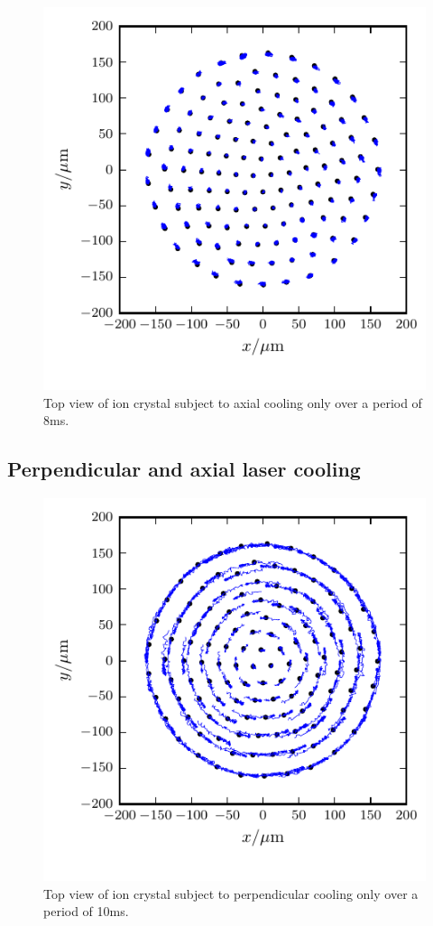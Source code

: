 \documentclass[
  aps,
  reprint,
  twoside,
  showpacs,
  amsmath,
  amssymb,
  floatfix
]{revtex4-1}
\begin{document}
\begin{figure}
\includegraphics{figures/topView44_115kHzAxial_8ms.pdf}
\caption{Top view of ion crystal subject to axial cooling only over a
  period of 8ms.}
  \label{fig:ionTrajectoriesAxial}
\end{figure}


\subsection{Perpendicular and axial laser cooling}

\begin{figure}
\includegraphics{figures/ionTrajectories_PerpCooling}
\caption{Top view of ion crystal subject to perpendicular cooling only over a
  period of 10ms.}
  \label{fig:ionTrajectoriesPerp}
\end{figure}
\end{document}
